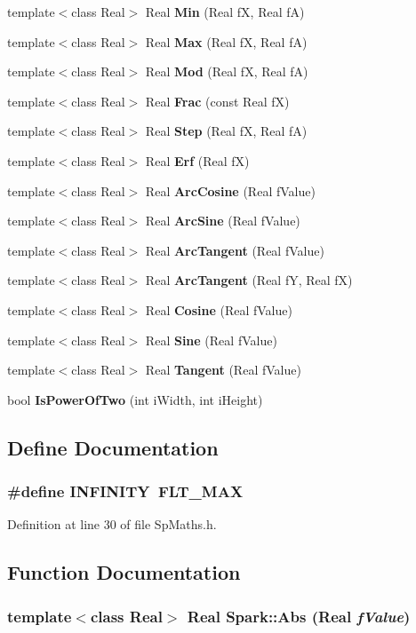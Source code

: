 \begin{CompactItemize}
\item 
template$<$class Real$>$ Real {\bf Min} (Real f\-X, Real f\-A)
\item 
template$<$class Real$>$ Real {\bf Max} (Real f\-X, Real f\-A)
\item 
template$<$class Real$>$ Real {\bf Mod} (Real f\-X, Real f\-A)
\item 
template$<$class Real$>$ Real {\bf Frac} (const Real f\-X)
\item 
template$<$class Real$>$ Real {\bf Step} (Real f\-X, Real f\-A)
\item 
template$<$class Real$>$ Real {\bf Erf} (Real f\-X)
\item 
template$<$class Real$>$ Real {\bf Arc\-Cosine} (Real f\-Value)
\item 
template$<$class Real$>$ Real {\bf Arc\-Sine} (Real f\-Value)
\item 
template$<$class Real$>$ Real {\bf Arc\-Tangent} (Real f\-Value)
\item 
template$<$class Real$>$ Real {\bf Arc\-Tangent} (Real f\-Y, Real f\-X)
\item 
template$<$class Real$>$ Real {\bf Cosine} (Real f\-Value)
\item 
template$<$class Real$>$ Real {\bf Sine} (Real f\-Value)
\item 
template$<$class Real$>$ Real {\bf Tangent} (Real f\-Value)
\item 
bool {\bf Is\-Power\-Of\-Two} (int i\-Width, int i\-Height)
\end{CompactItemize}


\subsection{Define Documentation}
\subsubsection{\setlength{\rightskip}{0pt plus 5cm}\#define INFINITY\ FLT\_\-MAX}\label{SpMaths_8h_a0}


Definition at line 30 of file Sp\-Maths.h.

\subsection{Function Documentation}
\subsubsection{\setlength{\rightskip}{0pt plus 5cm}template$<$class Real$>$ Real Spark::Abs (Real {\em f\-Value})}\label{namespaceSpark_a40}


